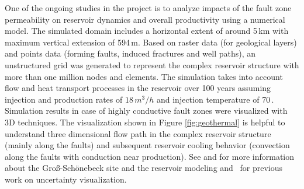 \documentclass[twocolumn]{svjour3}          %
\begin{document}
One of the ongoing studies in the project is to analyze impacts of the fault zone permeability on reservoir dynamics and overall productivity using a numerical model. The simulated domain includes a horizontal extent of around 5\,km with maximum vertical extension of 594\,m. Based on raster data (for geological layers) and points data (forming faults, induced fractures and well paths), an unstructured grid was generated to represent the complex reservoir structure with more than one million nodes and elements. The simulation takes into account flow and heat transport processes in the reservoir over 100 years assuming injection and production rates of $18\,m^3/h$ and injection temperature of 70\,\celsius. Simulation results in case of highly conductive fault zones were visualized with 3D techniques. The visualization shown in Figure \ref{fig:geothermal} is helpful to understand three dimensional flow path in the complex reservoir structure (mainly along the faults) and subsequent reservoir cooling behavior (convection along the faults with conduction near production). See \cite{zimmermann:geothermal} and \cite{bloecher:geothermal} for more information about the Gro{\ss}-Sch\"onebeck site and the reservoir modeling and~\cite{zehner:uncertainty} for previous work on uncertainty visualization.
\end{document}
